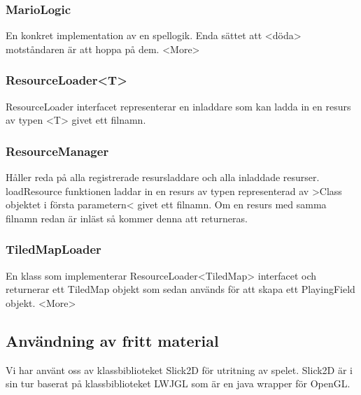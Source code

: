 \subsubsection{MarioLogic}
En konkret implementation av en spellogik. Enda sättet att <döda> motståndaren är att hoppa på dem. <More>\\
\subsubsection{ResourceLoader<T>}
ResourceLoader interfacet representerar en inladdare som kan ladda in en resurs av typen <T> givet ett filnamn.\\
\subsubsection{ResourceManager}
Håller reda på alla registrerade resursladdare och alla inladdade resurser.\\
loadResource funktionen laddar in en resurs av typen representerad av >Class objektet i första parametern< givet ett filnamn. Om en resurs med samma filnamn redan är inläst så kommer denna att returneras.\\
\subsubsection{TiledMapLoader}
En klass som implementerar ResourceLoader<TiledMap> interfacet och returnerar ett TiledMap objekt som sedan används för att skapa ett PlayingField objekt. <More>\\
\subsection{Användning av fritt material}
Vi har använt oss av klassbiblioteket Slick2D för utritning av spelet. Slick2D är i sin tur baserat på klassbiblioteket LWJGL som är en java wrapper för OpenGL.
